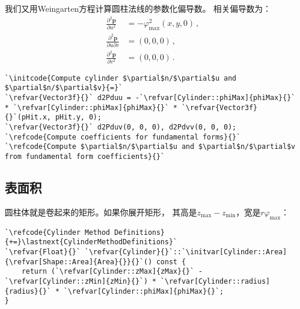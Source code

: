 我们又用Weingarten方程计算圆柱法线的参数化偏导数。
相关偏导数为：
\begin{align*}
    \frac{\partial^2\bm p}{\partial u^2}         & =-\varphi_{\max}^2(x,y,0)\, , \\
    \frac{\partial^2\bm p}{\partial u\partial v} & =(0,0,0)\, ,                  \\
    \frac{\partial^2\bm p}{\partial v^2}         & =(0,0,0)\, .
\end{align*}
\begin{lstlisting}
`\initcode{Compute cylinder $\partial$n/$\partial$u and $\partial$n/$\partial$v}{=}`
`\refvar{Vector3f}{}` d2Pduu = -`\refvar[Cylinder::phiMax]{phiMax}{}` * `\refvar[Cylinder::phiMax]{phiMax}{}` * `\refvar{Vector3f}{}`(pHit.x, pHit.y, 0);
`\refvar{Vector3f}{}` d2Pduv(0, 0, 0), d2Pdvv(0, 0, 0);
`\refcode{Compute coefficients for fundamental forms}{}`
`\refcode{Compute $\partial$n/$\partial$u and $\partial$n/$\partial$v from fundamental form coefficients}{}`
\end{lstlisting}

\subsection{表面积}\label{sub:表面积3}
圆柱体就是卷起来的矩形。如果你展开矩形，
其高是$z_{\max}-z_{\min}$，宽是$r\varphi_{\max}$：
\begin{lstlisting}
`\refcode{Cylinder Method Definitions}{+=}\lastnext{CylinderMethodDefinitions}`
`\refvar{Float}{}` `\refvar{Cylinder}{}`::`\initvar[Cylinder::Area]{\refvar[Shape::Area]{Area}{}}{}`() const {
    return (`\refvar[Cylinder::zMax]{zMax}{}` - `\refvar[Cylinder::zMin]{zMin}{}`) * `\refvar[Cylinder::radius]{radius}{}` * `\refvar[Cylinder::phiMax]{phiMax}{}`;
}
\end{lstlisting}